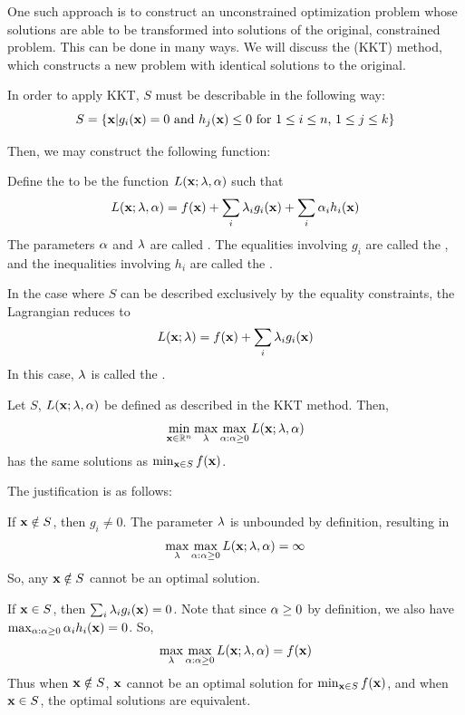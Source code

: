 One such approach is to construct an unconstrained optimization problem whose solutions are able to be transformed into solutions of the original, constrained problem. This can be done in many ways. We will discuss the  (KKT) method, which constructs a new problem with identical solutions to the original.

In order to apply KKT, $S$ must be describable in the following way:
$$S = \{\vx | g_i(\vx)=0 \textrm{ and } h_j(\vx) \leq 0 \textrm{ for  }1\leq i \leq n \textrm{, } 1\leq j\leq k\}$$

Then, we may construct the following function:

\begin{definition}
Define the  to be the function $L(\vx;\vlambda,\valpha)$ such that
$$L(\vx;\vlambda,\valpha) = f(\vx) + \sum_{i} \lambda_{i} g_{i}(\vx) + \sum_{i} \alpha_{i} h_{i}(\vx)$$
The parameters $\valpha$ and $\vlambda$ are called  . The equalities involving $g_{i}$ are called the , and the inequalities involving $h_{i}$ are called the .
\end{definition}

\begin{remark}
In the case where $S$ can be described exclusively by the equality constraints, the Lagrangian reduces to $$L(\vx;\vlambda) = f(\vx) + \sum_{i} \lambda_{i} g_{i}(\vx)$$ In this case, $\vlambda$ is called the . 
\end{remark}

\begin{proposition}
Let $S$, $L(\vx;\vlambda,\valpha)$ be defined as described in the KKT method. Then, 
$$\min_{\vx \in \mathbb{R}^n} \max_{\vlambda} \max_{\valpha : \valpha \geq 0} L(\vx;\vlambda,\valpha)$$
has the same solutions as $\min_{\vx\in S} f(\vx)$.
\end{proposition}

The justification is as follows:

If $\vx \notin S$, then $g_{i}\neq 0$. The parameter $\vlambda$ is unbounded by definition, resulting in 
$$\max_{\vlambda} \max_{\valpha : \valpha \geq 0} L(\vx;\vlambda,\valpha)=\infty$$
So, any $\vx \notin S$ cannot be an optimal solution.

If $\vx \in S$, then $\sum_{i}\lambda_{i} g_{i}(\vx) = 0$. Note that since $\valpha\geq0$ by definition, we also have $\max_{\valpha : \valpha \geq 0} \valpha_{i} h_{i}(\vx) = 0$. So,   
$$\max_{\vlambda} \max_{\valpha : \valpha \geq 0} L(\vx;\vlambda,\valpha) = f(\vx)$$ 
Thus when $\vx \notin S$, $\vx$ cannot be an optimal solution for $\min_{\vx\in S} f(\vx)$, and when $\vx \in S$, the optimal solutions are equivalent. 


